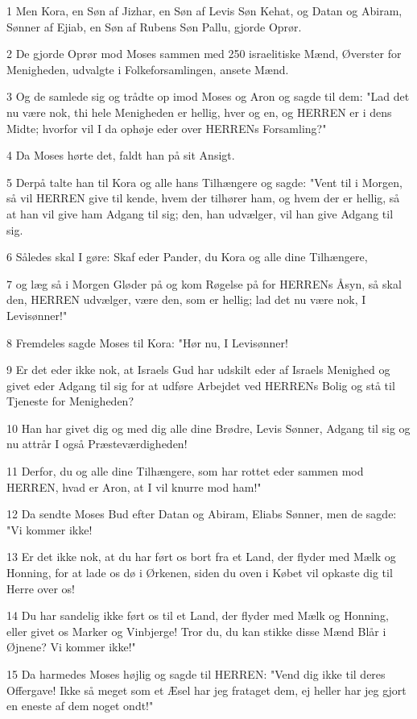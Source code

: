 \par 1 Men Kora, en Søn af Jizhar, en Søn af Levis Søn Kehat, og Datan og Abiram, Sønner af Ejiab, en Søn af Rubens Søn Pallu, gjorde Oprør.
\par 2 De gjorde Oprør mod Moses sammen med 250 israelitiske Mænd, Øverster for Menigheden, udvalgte i Folkeforsamlingen, ansete Mænd.
\par 3 Og de samlede sig og trådte op imod Moses og Aron og sagde til dem: "Lad det nu være nok, thi hele Menigheden er hellig, hver og en, og HERREN er i dens Midte; hvorfor vil I da ophøje eder over HERRENs Forsamling?"
\par 4 Da Moses hørte det, faldt han på sit Ansigt.
\par 5 Derpå talte han til Kora og alle hans Tilhængere og sagde: "Vent til i Morgen, så vil HERREN give til kende, hvem der tilhører ham, og hvem der er hellig, så at han vil give ham Adgang til sig; den, han udvælger, vil han give Adgang til sig.
\par 6 Således skal I gøre: Skaf eder Pander, du Kora og alle dine Tilhængere,
\par 7 og læg så i Morgen Gløder på og kom Røgelse på for HERRENs Åsyn, så skal den, HERREN udvælger, være den, som er hellig; lad det nu være nok, I Levisønner!"
\par 8 Fremdeles sagde Moses til Kora: "Hør nu, I Levisønner!
\par 9 Er det eder ikke nok, at Israels Gud har udskilt eder af Israels Menighed og givet eder Adgang til sig for at udføre Arbejdet ved HERRENs Bolig og stå til Tjeneste for Menigheden?
\par 10 Han har givet dig og med dig alle dine Brødre, Levis Sønner, Adgang til sig og nu attrår I også Præsteværdigheden!
\par 11 Derfor, du og alle dine Tilhængere, som har rottet eder sammen mod HERREN, hvad er Aron, at I vil knurre mod ham!"
\par 12 Da sendte Moses Bud efter Datan og Abiram, Eliabs Sønner, men de sagde: "Vi kommer ikke!
\par 13 Er det ikke nok, at du har ført os bort fra et Land, der flyder med Mælk og Honning, for at lade os dø i Ørkenen, siden du oven i Købet vil opkaste dig til Herre over os!
\par 14 Du har sandelig ikke ført os til et Land, der flyder med Mælk og Honning, eller givet os Marker og Vinbjerge! Tror du, du kan stikke disse Mænd Blår i Øjnene? Vi kommer ikke!"
\par 15 Da harmedes Moses højlig og sagde til HERREN: "Vend dig ikke til deres Offergave! Ikke så meget som et Æsel har jeg frataget dem, ej heller har jeg gjort en eneste af dem noget ondt!"
